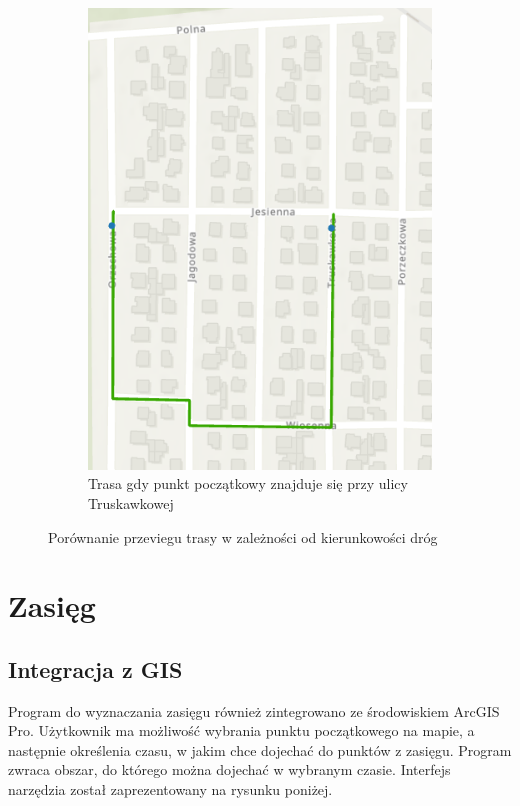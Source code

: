 \documentclass{article}
\begin{document}
\begin{figure}[H]
\begin{subfigure}[b]{0.45\textwidth}
        \includegraphics[width=\textwidth]{img/kierunek-truskawkowa-orzechowa.png}
        \caption{Trasa gdy punkt początkowy znajduje się przy ulicy Truskawkowej}
    \end{subfigure}
    \caption{Porównanie przeviegu trasy w zależności od kierunkowości dróg}
\end{figure}

\section{Zasięg}
\subsection{Integracja z GIS}
Program do wyznaczania zasięgu również zintegrowano ze środowiskiem ArcGIS Pro. Użytkownik ma możliwość wybrania punktu początkowego na mapie, a następnie określenia czasu, w jakim chce dojechać do punktów z zasięgu. Program zwraca obszar, do którego można dojechać w wybranym czasie. Interfejs narzędzia został zaprezentowany na rysunku poniżej.
\end{document}

